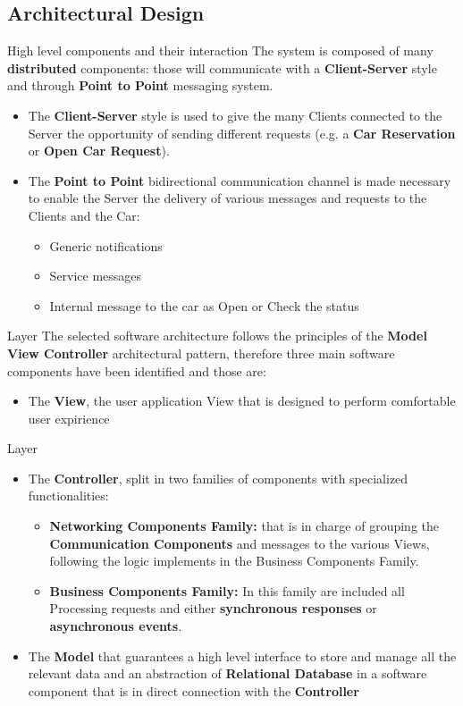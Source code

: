 \documentclass{../Common/Structure/pdf_presentation}
\begin{document}
	\subsection{Architectural Design}
	\begin{frame}{High level components and their interaction}
		The system is composed of many \textbf{distributed} components: those will communicate with a \textbf{Client-Server} style and through \textbf{Point to Point} messaging system.
		\begin{itemize}
			\item The \textbf{Client-Server} style is used to give the many Clients connected to the Server the opportunity of sending different requests (e.g. a \textbf{Car Reservation} or \textbf{Open Car Request}).
			\item The \textbf{Point to Point} bidirectional communication channel is made necessary to enable the Server the delivery of various messages and requests to the Clients and the Car:
			\begin{itemize}
				\item Generic notifications
				\item Service messages
				\item Internal message to the car as Open or Check the status
			\end{itemize}
		\end{itemize}
	\end{frame}
	\begin{frame}{Layer}
		The selected software architecture follows the principles of the \textbf{Model View Controller} architectural pattern, therefore three main software components have been identified and those are:
		\begin{itemize}
			\item The \textbf{View}, the user application View that is designed to perform comfortable user expirience
		\end{itemize}
	\end{frame}
	\begin{frame}{Layer}
		\begin{itemize}
			\item The \textbf{Controller}, split in two families of components with specialized functionalities:
				\begin{itemize}
					\item \textbf{Networking Components Family:} that is in charge of grouping the \textbf{Communication Components} and messages to the various Views, following the logic implements in the Business Components Family.
					\item \textbf{Business Components Family:} In this family are included all Processing requests and either \textbf{synchronous responses} or \textbf{asynchronous events}.
				\end{itemize}
			\item The \textbf{Model} that guarantees a high level interface to store and manage all the \PowerEnJoy{} relevant data and an abstraction of \textbf{Relational Database} in a software component that is in direct connection with the \textbf{Controller}
		\end{itemize}
	\end{frame}
\end{document}
